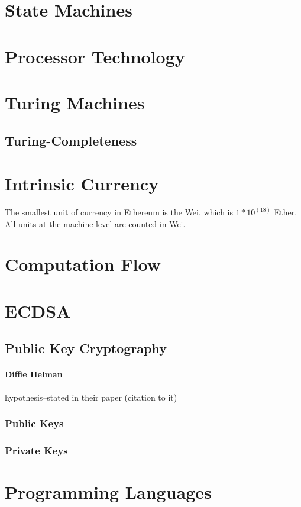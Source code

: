 \documentclass[10pt,a4paper,leqno,bibliography=totoc]{scrartcl}
\newenvironment{alphafootnotes}
{\par\edef\savedfootnotenumber{\number\value{footnote}}
\renewcommand{\thefootnote}{\alph{footnote}}
\setcounter{footnote}{0}}
{\par\setcounter{footnote}{\savedfootnotenumber}}
\begin{document}
\begin{alphafootnotes}
\begin{multicols*}{2}
	\section{State Machines}
	\section{Processor Technology}
	\section{Turing Machines}
		\subsection{Turing-Completeness}
	\section{Intrinsic Currency}
		The smallest unit of currency in Ethereum is the Wei, which is $1*10^(18)$ Ether. All units at the machine level are counted in Wei.
	\section{Computation Flow}

	\section{ECDSA}

		\subsection{Public Key Cryptography}
				\paragraph{Diffie Helman} hypothesis--stated in their paper (citation to it)
			\subsubsection{Public Keys}

			\subsubsection{Private Keys}

	\section{Programming Languages}


\end{multicols*}
\end{alphafootnotes}
\end{document}

